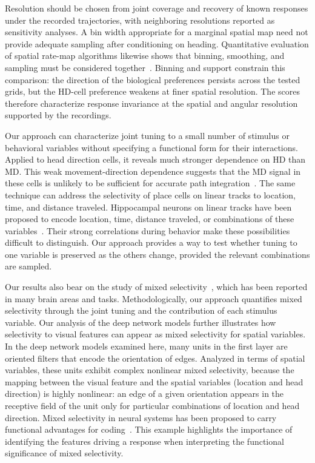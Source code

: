 \documentclass[11pt]{article}
\begin{document}
Resolution should be chosen from joint coverage and recovery of known responses under the recorded trajectories, with neighboring resolutions reported as sensitivity analyses. A bin width appropriate for a marginal spatial map need not provide adequate sampling after conditioning on heading. Quantitative evaluation of spatial rate-map algorithms likewise shows that binning, smoothing, and sampling must be considered together~\cite{Grieves2023ratemaps}. Binning and support constrain this comparison: the direction of the biological preferences persists across the tested grids, but the HD-cell preference weakens at finer spatial resolution. The scores therefore characterize response invariance at the spatial and angular resolution supported by the recordings.

Our approach can characterize joint tuning to a small number of stimulus or behavioral variables without specifying a functional form for their interactions. Applied to head direction cells, it reveals much stronger dependence on HD than MD. This weak movement-direction dependence suggests that the MD signal in these cells is unlikely to be sufficient for accurate path integration~\cite{Mcnaughton2006}.
The same technique can address the selectivity of place cells on linear tracks to location, time, and distance traveled. Hippocampal neurons on linear tracks have been proposed to encode location, time, distance traveled, or combinations of these variables~\cite{Eichenbaum2014time,Chen2024}. Their strong correlations during behavior make these possibilities difficult to distinguish. Our approach provides a way to test whether tuning to one variable is preserved as the others change, provided the relevant combinations are sampled.

Our results also bear on the study of mixed selectivity~\cite{Rigotti2013}, which has been reported in many brain areas and tasks. Methodologically, our approach quantifies mixed selectivity through the joint tuning and the contribution of each stimulus variable. Our analysis of the deep network models further illustrates how selectivity to visual features can appear as mixed selectivity for spatial variables. In the deep network models examined here, many units in the first layer are oriented filters that encode the orientation of edges.
Analyzed in terms of spatial variables, these units exhibit complex nonlinear mixed selectivity, because the mapping between the visual feature and the spatial variables (location and head direction) is highly nonlinear: an edge of a given orientation appears in the receptive field of the unit only for particular combinations of location and head direction. Mixed selectivity in neural systems has been proposed to carry functional advantages for coding~\cite{Rigotti2013,Fusi2016neurons}. This example highlights the importance of identifying the features driving a response when interpreting the functional significance of mixed selectivity.
\end{document}
